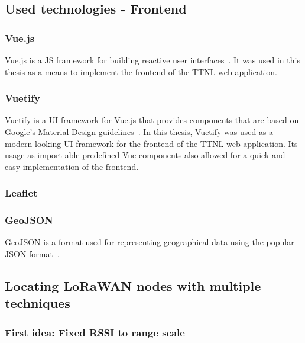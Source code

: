 \subsection{Used technologies - Frontend}

\subsubsection{Vue.js}

Vue.js is a \ac{JS} framework for building reactive user interfaces~\cite{evan_you_vuejs_2023}.
It was used in this thesis as a means to implement the frontend of the \ac{TTNL} web application.

\subsubsection{Vuetify}

Vuetify is a \ac{UI} framework for Vue.js that provides components that are based on Google's Material Design guidelines~\cite{vuetify_vuetify_2023}\cite{google_llc_material_nodate}.
In this thesis, Vuetify was used as a modern looking \ac{UI} framework for the frontend of the \ac{TTNL} web application.
Its usage as import-able predefined Vue components also allowed for a quick and easy implementation of the frontend.

\subsubsection{Leaflet}

\subsubsection{GeoJSON}

GeoJSON is a format used for representing geographical data using the popular \ac{JSON} format~\cite{butler_geojson_2016}.

\subsection{Locating \acs{LoRaWAN} nodes with multiple techniques}

\subsubsection{First idea: Fixed \ac{RSSI} to range scale}

